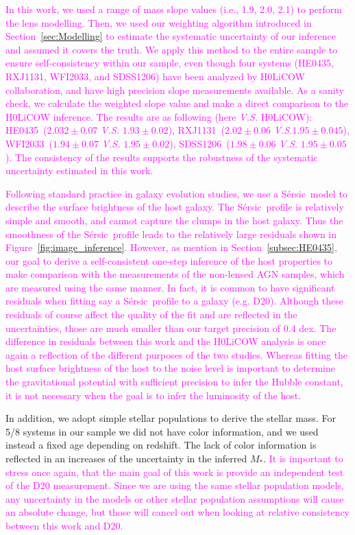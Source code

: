 \documentclass[fleqn,usenatbib]{mnras}
\newcommand{\sersic}{S\'ersic}
\newcommand{\mstar}{{$M_*$}}
\newcommand{\pink}[1]{{\textcolor{magenta}{#1}}}
\begin{document}
\pink{In this work, we used a range of mass slope values (i.e., 1.9, 2.0, 2.1) to perform the lens modelling. Then, we used our weighting algorithm introduced in Section~\ref{sec:Modelling} to estimate the systematic uncertainty of our inference and assumed it covers the truth. We apply this method to the entire sample to ensure self-consistency within our sample, even though four systems (HE0435, RXJ1131, WFI2033, and SDSS1206) have been analyzed by H0LiCOW collaboration, and have high precision slope measurements available. As a sanity check, we calculate the weighted slope value and make a direct comparison to the H0LiCOW inference. The results are as following (here {\it V.S.} H0LiCOW): HE0435~($2.032\pm 0.07$ {\it V.S.} $1.93\pm0.02$), RXJ1131~($2.02\pm 0.06$ {\it V.S.}$1.95\pm0.045$), WFI2033~($1.94\pm 0.07$ {\it V.S.} $1.95\pm0.02$), SDSS1206~($1.98\pm 0.06$ {\it V.S.} $1.95\pm0.05$). The consistency of the results supports the robustness of the systematic uncertainty estimated in this work.}

\pink{Following standard practice in galaxy evolution studies, we use a \sersic\ model to describe the surface brightness of the host galaxy. The \sersic\ profile is relatively simple and smooth, and cannot capture the clumps in the host galaxy. Thus the smoothness of the \sersic\ profile leads to the relatively large residuals shown in Figure~\ref{fig:image_inference}. However, as mention in Section~\ref{subsec:HE0435}, our goal to derive a self-consistent one-step inference of the host properties to make comparison with the measurements of the non-lensed AGN samples, which are measured using the same manner. In fact, it is common to have significant residuals when fitting say a \sersic\ profile to a galaxy (e.g. D20). Although these residuals of course affect the quality of the fit and are reflected in the uncertainties, those are much smaller than our target precision of 0.4 dex.  The difference in residuals between this work and the H0LiCOW analysis is once again a reflection of the different purposes of the two studies. Whereas fitting the host surface brightness of the host to the noise level is important to determine the gravitational potential with sufficient precision to infer the Hubble constant, it is not necessary when the goal is to infer the luminosity of the host.
}

In addition, we adopt simple stellar populations to derive the stellar mass. For 5/8 systems in our sample we did not have color information, and we used instead a fixed age depending on redshift. The lack of color information is reflected in an increases of the uncertainty in the inferred \mstar. \pink{It is important to stress once again, that the main goal of this work is provide an independent test of the D20 measurement. Since we are using the same stellar population models, any uncertainty in the models or other stellar population assumptions will cause an absolute change, but those will cancel out when looking at relative consistency between this work and D20.}
\end{document}
